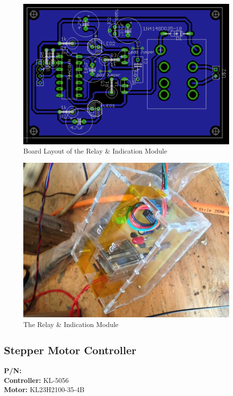 \documentclass[12pt]{article}
\begin{document}
\clearpage


\begin{figure}[!h]
\centering
\includegraphics[scale=1]{relayboard}
\caption{Board Layout of the Relay \& Indication Module}
\end{figure}

\begin{figure}[!h]
\centering
\includegraphics[scale=0.55]{relayreal}
\caption{The Relay \& Indication Module}
\end{figure}

\clearpage

\subsection{Stepper Motor Controller}

\textbf{P/N:} \\
\textbf{Controller:} KL-5056 \\
\textbf{Motor:} KL23H2100-35-4B \\
\end{document}
